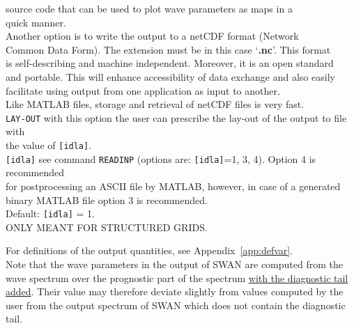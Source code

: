 \documentclass[12pt]{book}
\begin{document}
\begin{tabbing}
                   source code that can be used to plot wave parameters as maps in a\\
                   quick manner.\\
                   Another option is to write the output to a netCDF format (Network\\
                   Common Data Form). The extension must be in this case `{\bf .nc}'. This format\\
                   is self-describing and machine independent. Moreover, it is an open standard\\
                   and portable. This will enhance accessibility of data exchange and also easily\\
                   facilitate using output from one application as input to another.\\
                   Like MATLAB files, storage and retrieval of netCDF files is very fast.\-\\
{\tt LAY-OUT}   \> with this option the user can prescribe the lay-out of the output to file with\+\\
                   the value of {\tt [idla]}.\-\\
{\tt [idla]}    \> see command {\tt READINP} (options are: {\tt [idla]}=1, 3, 4). Option 4 is recommended\+\\
                   for postprocessing an ASCII file by MATLAB, however, in case of a generated\\
                   binary MATLAB file option 3 is recommended.\\
                   Default: {\tt [idla]} = 1.\\
                   ONLY MEANT FOR STRUCTURED GRIDS.\-\\
\end{tabbing}

\noindent
For definitions of the output quantities, see Appendix~\ref{app:defvar}.
\\[2ex]
Note that the wave parameters in the output of SWAN are computed from the wave spectrum over the prognostic part of the spectrum
\underline{with the diagnostic tail added}. Their value may therefore deviate slightly from values computed by the user from the
output spectrum of SWAN which does not contain the diagnostic tail.
\end{document}
